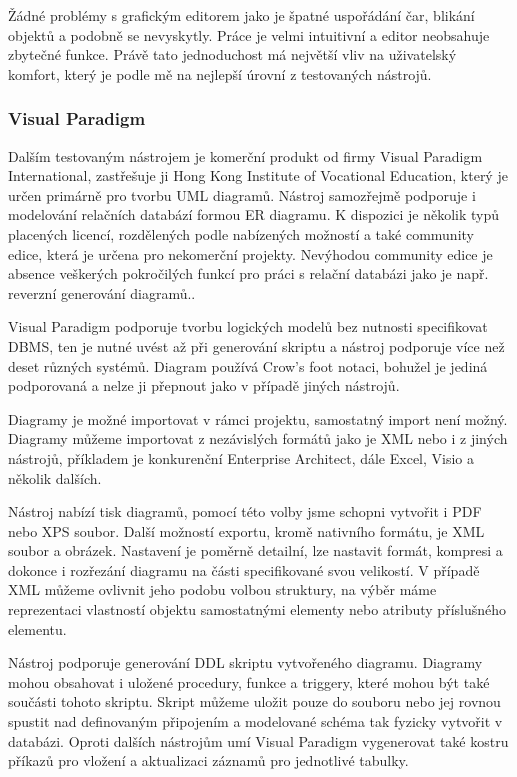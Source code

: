 \documentclass[czech,bachelor,public,dept460,male,oneside]{diploma}
\begin{document}
		Žádné problémy s grafickým editorem jako je špatné uspořádání čar, blikání objektů a podobně se nevyskytly. Práce je velmi intuitivní a editor neobsahuje 
		zbytečné funkce. Právě tato jednoduchost má největší vliv na uživatelský komfort, který je podle mě na nejlepší úrovní z testovaných nástrojů.
		
		\subsubsection{Visual Paradigm}
		Dalším testovaným nástrojem je komerční produkt od firmy Visual Paradigm International, zastřešuje ji Hong Kong Institute of Vocational Education, který je určen primárně pro tvorbu UML diagramů. Nástroj samozřejmě podporuje i modelování relačních databází formou ER diagramu. K dispozici je několik typů placených licencí, rozdělených podle nabízených možností a také community edice, která je určena pro nekomerční projekty. Nevýhodou community edice je absence veškerých pokročilých funkcí pro práci s relační databázi jako je např. reverzní generování diagramů..
		
		Visual Paradigm podporuje tvorbu logických modelů bez nutnosti specifikovat DBMS, ten je nutné uvést až při generování skriptu a nástroj podporuje více než deset různých systémů. Diagram používá Crow's foot notaci, bohužel je jediná podporovaná a nelze ji přepnout jako v případě jiných nástrojů.
		
		Diagramy je možné importovat v rámci projektu, samostatný import není možný. Diagramy můžeme importovat z nezávislých formátů jako je XML nebo i z jiných nástrojů, příkladem je konkurenční Enterprise Architect, dále Excel, Visio a několik dalších. 
		
		Nástroj nabízí tisk diagramů, pomocí této volby jsme schopni vytvořit i PDF nebo XPS soubor. Další možností exportu, kromě nativního formátu, je XML soubor a obrázek. Nastavení je poměrně detailní, lze nastavit formát, kompresi a dokonce i rozřezání diagramu na části specifikované svou velikostí. V případě XML můžeme ovlivnit jeho podobu volbou struktury, na výběr máme reprezentaci vlastností objektu samostatnými elementy nebo atributy příslušného elementu.
		
		Nástroj podporuje generování DDL skriptu vytvořeného diagramu. Diagramy mohou obsahovat i uložené procedury, funkce a triggery, které mohou být také součásti  tohoto skriptu. Skript můžeme uložit pouze do souboru nebo jej rovnou spustit nad definovaným připojením a modelované schéma tak fyzicky vytvořit v databázi. Oproti dalších nástrojům umí Visual Paradigm vygenerovat také kostru příkazů pro vložení a aktualizaci záznamů pro jednotlivé tabulky.
		
\end{document}
